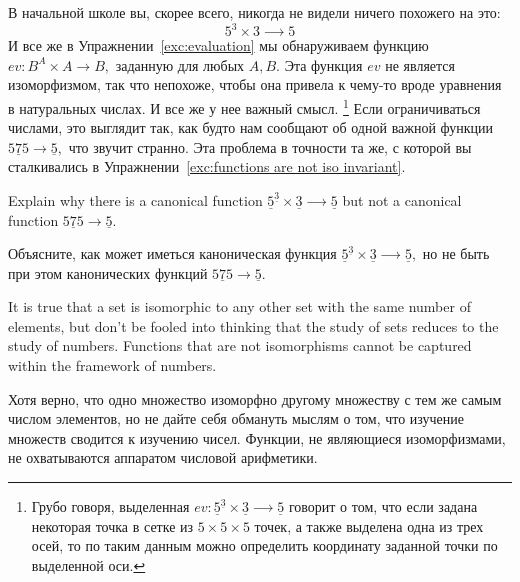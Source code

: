 \documentclass[../main/CT4S-EN-RU]{subfiles}
\begin{document}
\begin{blockRUS}
В начальной школе вы, скорее всего, никогда не видели ничего похожего на это:
$$5^3\times 3{⟶} 5$$
И все же в Упражнении~\ref{exc:evaluation} мы обнаруживаем функцию $ev\colon B^A\times A{→} B,$ заданную для любых $A,B.$ Эта функция $ev$ не является изоморфизмом, так что непохоже, чтобы она привела к чему-то вроде уравнения в натуральных числах. И все же у нее важный смысл.%
\footnote{Грубо говоря, выделенная $ev\colon\underline{5}^{\underline{3}}\times\underline{3}{⟶} \underline{5}$ говорит о том, что если задана некоторая точка в сетке из $5\times 5\times 5$ точек, а также выделена одна из трех осей, то по таким данным можно определить координату заданной точки по выделенной оси.}
Если ограничиваться числами, это выглядит так, как будто нам сообщают об одной важной функции $\underline{575}{→}\underline{5},$ что звучит странно. Эта проблема в точности та же, с которой вы сталкивались в Упражнении~\ref{exc:functions are not iso invariant}.
\end{blockRUS}

\begin{exerciseENG}
Explain why there is a canonical function $\underline{5}^{\underline{3}}\times\underline{3}{⟶} \underline{5}$ but not a canonical function $\underline{575}{→}\underline{5}.$
\end{exerciseENG}

\begin{exerciseRUS}
Объясните, как может иметься каноническая функция $\underline{5}^{\underline{3}}\times\underline{3}{⟶} \underline{5},$ но не быть при этом канонических функций $\underline{575}{→}\underline{5}.$
\end{exerciseRUS}

\begin{sloganENG}
It is true that a set is isomorphic to any other set with the same number of elements, but don't be fooled into thinking that the study of sets reduces to the study of numbers. Functions that are not isomorphisms cannot be captured within the framework of numbers. 
\end{sloganENG}

\begin{sloganRUS}
Хотя верно, что одно множество изоморфно другому множеству с тем же самым числом элементов, но не дайте себя обмануть мыслям о том, что изучение множеств сводится к изучению чисел. Функции, не являющиеся изоморфизмами, не охватываются аппаратом числовой арифметики. 
\end{sloganRUS}
\end{document}
